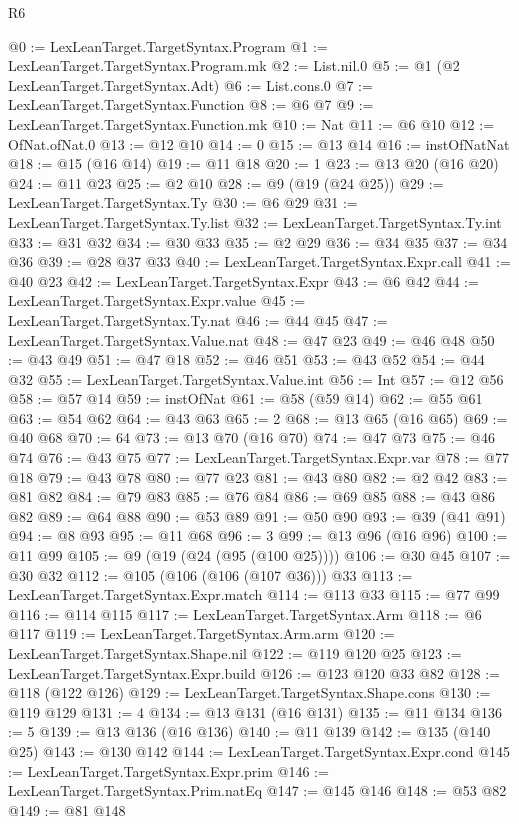 \begin{lexlean}{R6}
\begin{coremodule}
@0 := LexLeanTarget.TargetSyntax.Program
@1 := LexLeanTarget.TargetSyntax.Program.mk
@2 := List.nil.{0}
@5 := @1 (@2 LexLeanTarget.TargetSyntax.Adt)
@6 := List.cons.{0}
@7 := LexLeanTarget.TargetSyntax.Function
@8 := @6 @7
@9 := LexLeanTarget.TargetSyntax.Function.mk
@10 := Nat
@11 := @6 @10
@12 := OfNat.ofNat.{0}
@13 := @12 @10
@14 := 0
@15 := @13 @14
@16 := instOfNatNat
@18 := @15 (@16 @14)
@19 := @11 @18
@20 := 1
@23 := @13 @20 (@16 @20)
@24 := @11 @23
@25 := @2 @10
@28 := @9 (@19 (@24 @25))
@29 := LexLeanTarget.TargetSyntax.Ty
@30 := @6 @29
@31 := LexLeanTarget.TargetSyntax.Ty.list
@32 := LexLeanTarget.TargetSyntax.Ty.int
@33 := @31 @32
@34 := @30 @33
@35 := @2 @29
@36 := @34 @35
@37 := @34 @36
@39 := @28 @37 @33
@40 := LexLeanTarget.TargetSyntax.Expr.call
@41 := @40 @23
@42 := LexLeanTarget.TargetSyntax.Expr
@43 := @6 @42
@44 := LexLeanTarget.TargetSyntax.Expr.value
@45 := LexLeanTarget.TargetSyntax.Ty.nat
@46 := @44 @45
@47 := LexLeanTarget.TargetSyntax.Value.nat
@48 := @47 @23
@49 := @46 @48
@50 := @43 @49
@51 := @47 @18
@52 := @46 @51
@53 := @43 @52
@54 := @44 @32
@55 := LexLeanTarget.TargetSyntax.Value.int
@56 := Int
@57 := @12 @56
@58 := @57 @14
@59 := instOfNat
@61 := @58 (@59 @14)
@62 := @55 @61
@63 := @54 @62
@64 := @43 @63
@65 := 2
@68 := @13 @65 (@16 @65)
@69 := @40 @68
@70 := 64
@73 := @13 @70 (@16 @70)
@74 := @47 @73
@75 := @46 @74
@76 := @43 @75
@77 := LexLeanTarget.TargetSyntax.Expr.var
@78 := @77 @18
@79 := @43 @78
@80 := @77 @23
@81 := @43 @80
@82 := @2 @42
@83 := @81 @82
@84 := @79 @83
@85 := @76 @84
@86 := @69 @85
@88 := @43 @86 @82
@89 := @64 @88
@90 := @53 @89
@91 := @50 @90
@93 := @39 (@41 @91)
@94 := @8 @93
@95 := @11 @68
@96 := 3
@99 := @13 @96 (@16 @96)
@100 := @11 @99
@105 := @9 (@19 (@24 (@95 (@100 @25))))
@106 := @30 @45
@107 := @30 @32
@112 := @105 (@106 (@106 (@107 @36))) @33
@113 := LexLeanTarget.TargetSyntax.Expr.match
@114 := @113 @33
@115 := @77 @99
@116 := @114 @115
@117 := LexLeanTarget.TargetSyntax.Arm
@118 := @6 @117
@119 := LexLeanTarget.TargetSyntax.Arm.arm
@120 := LexLeanTarget.TargetSyntax.Shape.nil
@122 := @119 @120 @25
@123 := LexLeanTarget.TargetSyntax.Expr.build
@126 := @123 @120 @33 @82
@128 := @118 (@122 @126)
@129 := LexLeanTarget.TargetSyntax.Shape.cons
@130 := @119 @129
@131 := 4
@134 := @13 @131 (@16 @131)
@135 := @11 @134
@136 := 5
@139 := @13 @136 (@16 @136)
@140 := @11 @139
@142 := @135 (@140 @25)
@143 := @130 @142
@144 := LexLeanTarget.TargetSyntax.Expr.cond
@145 := LexLeanTarget.TargetSyntax.Expr.prim
@146 := LexLeanTarget.TargetSyntax.Prim.natEq
@147 := @145 @146
@148 := @53 @82
@149 := @81 @148

\end{coremodule}
\end{lexlean}
